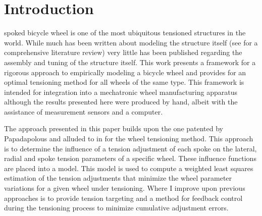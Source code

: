 \documentclass[journal]{IEEEtran}
\begin{document}
\section{Introduction}
 spoked bicycle wheel is one of the most ubiquitous tensioned structures in the world. While much has been written about modeling the structure itself (see \cite{FordThesis} for a comprehensive literature review) very little has been published regarding the assembly and tuning of the structure itself.  This work presents a framework for a rigorous approach to empirically modeling a bicycle wheel and provides for an optimal tensioning method for all wheels of the same type.  This framework is intended for integration into a mechatronic wheel manufacturing apparatus although the results presented here were produced by hand, albeit with the assistance of measurement sensors and a computer. 

The approach presented in this paper builds upon the one patented by Papadapolous \cite{Papadapoulos} and alluded to in \cite{HollandMech} for the wheel tensioning method. This approach is to determine the influence of a tension adjustment of each spoke on the lateral, radial and spoke tension parameters of a specific wheel.  These influence functions are placed into a model. This model is used to compute a weighted least squares estimation of the tension adjustments that minimize the wheel parameter variations for a given wheel under tensioning.  Where I improve upon previous approaches is to provide tension targeting and a method for feedback control during the tensioning process to minimize cumulative adjustment errors. 
\end{document}
